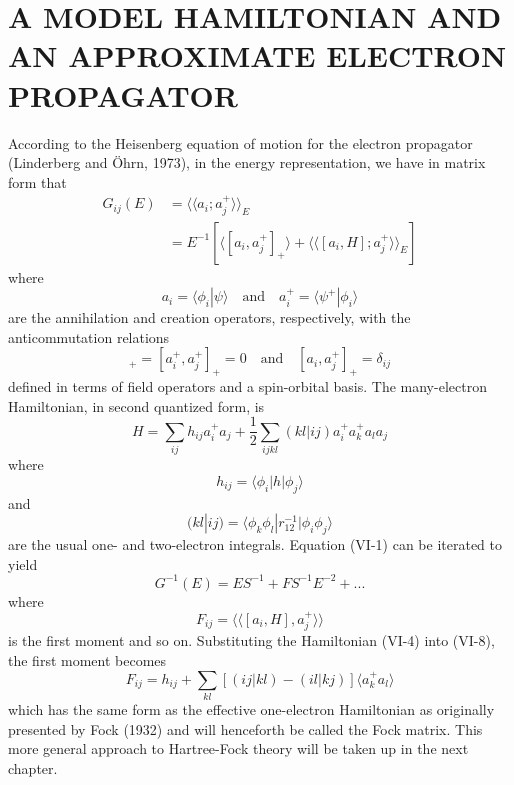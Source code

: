\documentclass[12pt,letterpaper]{report}
\begin{document}
\chapter{A MODEL HAMILTONIAN AND AN APPROXIMATE ELECTRON PROPAGATOR}

According to the Heisenberg equation of motion for the electron propagator (Linderberg and Öhrn, 1973), in the energy representation, we have in matrix form that
\begin{align}
G_{ij}(E) &= \langle\langle a_i ; a_j^+ \rangle\rangle_E \nonumber\\
&= E^{-1}[\langle [a_i, a_j^+]_+ \rangle + \langle\langle [a_i, H] ; a_j^+ \rangle\rangle_E]
\end{align}
where
\begin{equation}
a_i = \langle \phi_i | \psi \rangle \quad \text{and} \quad a_i^+ = \langle \psi^+ | \phi_i \rangle
\end{equation}
are the annihilation and creation operators, respectively, with the anticommutation relations
\begin{equation}
[a_i, a_j]_+ = [a_i^+, a_j^+]_+ = 0 \quad \text{and} \quad [a_i, a_j^+]_+ = \delta_{ij}
\end{equation}
defined in terms of field operators and a spin-orbital basis. The many-electron Hamiltonian, in second quantized form, is
\begin{equation}
H = \sum_{ij} h_{ij} a_i^+ a_j + \frac{1}{2} \sum_{ijkl} (kl|ij) a_i^+ a_k^+ a_l a_j
\end{equation}
where
\begin{equation}
h_{ij} = \langle \phi_i | h | \phi_j \rangle
\end{equation}
and
\begin{equation}
(kl|ij) = \langle \phi_k \phi_l | r_{12}^{-1} | \phi_i \phi_j \rangle
\end{equation}
are the usual one- and two-electron integrals. Equation (VI-1) can be iterated to yield
\begin{equation}
G^{-1}(E) = ES^{-1} + FS^{-1}E^{-2} + ...
\end{equation}
where
\begin{equation}
F_{ij} = \langle\langle [a_i, H], a_j^+ \rangle\rangle
\end{equation}
is the first moment and so on. Substituting the Hamiltonian (VI-4) into (VI-8), the first moment becomes
\begin{equation}
F_{ij} = h_{ij} + \sum_{kl} [(ij|kl) - (il|kj)] \langle a_k^+ a_l \rangle
\end{equation}
which has the same form as the effective one-electron Hamiltonian as originally presented by Fock (1932) and will henceforth be called the Fock matrix. This more general approach to Hartree-Fock theory will be taken up in the next chapter.
\end{document}
